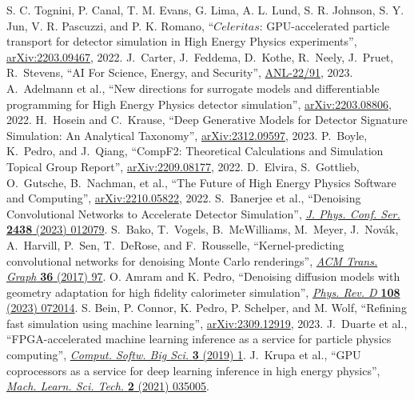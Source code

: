 \begin{thebibliography}{99}
 S. C. Tognini, P. Canal, T. M. Evans, G. Lima, A. L. Lund, S. R. Johnson, S. Y. Jun, V. R. Pascuzzi, and P. K. Romano, ``$Celeritas$: GPU-accelerated particle transport for detector simulation in High Energy Physics experiments'', \href{https://arxiv.org/abs/2203.09467}{arXiv:2203.09467}, 2022.
 J.~Carter, J.~Feddema, D.~Kothe, R.~Neely, J.~Pruet, R.~Stevens, ``AI For Science, Energy, and Security'', \href{https://www.anl.gov/ai-for-science-report}{ANL-22/91}, 2023.
 A.~Adelmann et al., ``New directions for surrogate models and differentiable programming for High Energy Physics detector simulation'', \href{https://arxiv.org/abs/2203.08806}{arXiv:2203.08806}, 2022.
 H.~Hosein and C.~Krause, ``Deep Generative Models for Detector Signature Simulation: An Analytical Taxonomy'', \href{https://arxiv.org/abs/2312.09597}{arXiv:2312.09597}, 2023.
 P.~Boyle, K.~Pedro, and J.~Qiang, ``CompF2: Theoretical Calculations and Simulation Topical Group Report'', \href{https://arxiv.org/abs/2209.08177}{arXiv:2209.08177}, 2022.
 D.~Elvira, S.~Gottlieb, O.~Gutsche, B.~Nachman, et al., ``The Future of High Energy Physics Software and Computing'', \href{https://arxiv.org/abs/2210.05822}{arXiv:2210.05822}, 2022.
 S.~Banerjee et al., ``Denoising Convolutional Networks to Accelerate Detector Simulation'', \href{https://doi.org/10.1088/1742-6596/2438/1/012079}{\textit{J. Phys. Conf. Ser.} \textbf{2438} (2023) 012079}.
 S.~Bako, T.~Vogels, B.~McWilliams, M.~Meyer, J.~Nov\'ak, A.~Harvill, P.~Sen, T.~DeRose, and F.~Rousselle, ``Kernel-predicting convolutional networks for denoising Monte Carlo renderings'', \href{https://doi.org/10.1145/3072959.3073708}{\textit{ACM Trans. Graph} \textbf{36} (2017) 97}.
 O. Amram and K. Pedro, ``Denoising diffusion models with geometry adaptation for high fidelity calorimeter simulation'', \href{https://doi.org/10.1103/PhysRevD.108.072014}{\textit{Phys. Rev. D} \textbf{108} (2023) 072014}.
 S. Bein, P. Connor, K. Pedro, P. Schelper, and M. Wolf, ``Refining fast simulation using machine learning'', \href{https://arxiv.org/abs/2309.12919}{arXiv:2309.12919}, 2023.
 J.~Duarte et al., ``FPGA-accelerated machine learning inference as a service for particle physics computing'', \href{https://doi.org/10.1007/s41781-019-0027-2}{\textit{Comput. Softw. Big Sci.} \textbf{3} (2019) 1}.
 J.~Krupa et al., ``GPU coprocessors as a service for deep learning inference in high energy physics'', \href{https://doi.org/10.1088/2632-2153/abec21}{\textit{Mach. Learn. Sci. Tech.} \textbf{2} (2021) 035005}.

\end{thebibliography}
